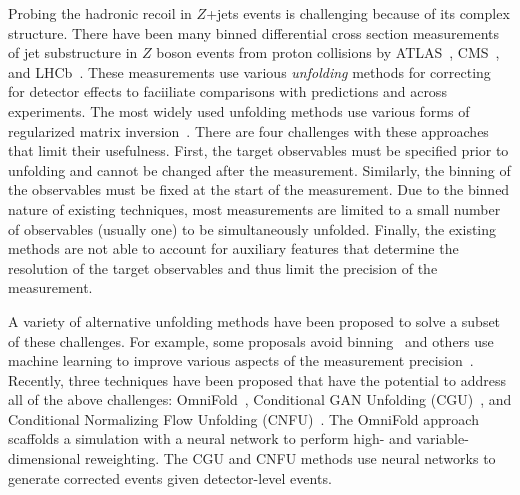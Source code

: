 Probing the hadronic recoil in $Z$+jets events is challenging because of its complex structure.  There have been many binned differential cross section measurements of jet substructure in $Z$ boson events from proton collisions by ATLAS~\cite{ATLAS:2017arb}, CMS~\cite{CMS:2013kfv,CMS:2021iwu}, and LHCb~\cite{LHCb:2019qoc}.  These measurements use various \textit{unfolding} methods for correcting for detector effects to faciiliate comparisons with predictions and across experiments. 
The most widely used unfolding methods use various forms of regularized matrix inversion~\cite{DAGOSTINI1995487,Hocker:1995kb,Schmitt:2012kp}.  There are four challenges with these approaches that limit their usefulness.   First, the target observables must be specified prior to unfolding and cannot be changed after the measurement.  Similarly, the binning of the observables must be fixed at the start of the measurement.  Due to the binned nature of existing techniques, most measurements are limited to a small number of observables (usually one) to be simultaneously unfolded.  Finally, the existing methods are not able to account for auxiliary features that determine the resolution of the target observables and thus limit the precision of the measurement.

A variety of alternative unfolding methods have been proposed to solve a subset of these challenges.   For example, some proposals avoid binning~\cite{Glazov:2017vni,Datta:2018mwd,Lindemann:1995ut,Aslan:2003vu} and others use machine learning to improve various aspects of the measurement precision~\cite{Gagunashvili:2010zw,Glazov:2017vni,Datta:2018mwd}.  Recently, three techniques have been proposed that have the potential to address all of the above challenges: OmniFold~\cite{1911.09107}, Conditional GAN Unfolding (CGU)~\cite{Bellagente:2019uyp}, and Conditional Normalizing Flow Unfolding (CNFU)~\cite{Bellagente:2020piv}.   The OmniFold approach scaffolds a simulation with a neural network to perform high- and variable-dimensional reweighting.  The CGU and CNFU methods use neural networks to generate corrected events given detector-level events.

